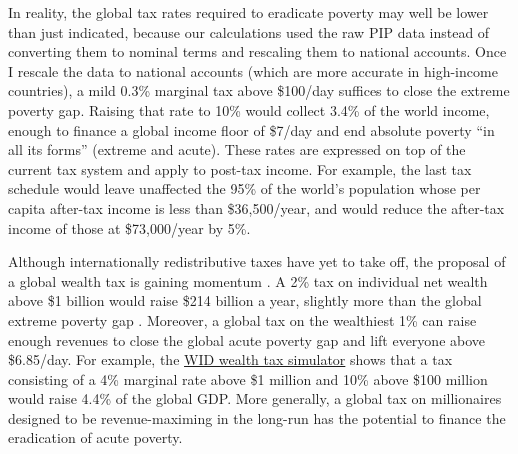 In reality, the global tax rates required to eradicate poverty may well be lower than just indicated, because our calculations used the raw PIP data instead of converting them to nominal terms and rescaling them to national accounts. Once I rescale the data to national accounts (which are more accurate in high-income countries), %
a mild 0.3\% marginal tax above \$100/day suffices to close the extreme poverty gap. Raising that rate to 10\% would collect 3.4\% of the world income, enough to finance a global income floor of \$7/day and end absolute poverty ``in all its forms'' (extreme and acute). %
These rates are expressed on top of the current tax system and apply to post-tax income. For example, the last tax schedule would leave unaffected the 95\% of the world's population whose per capita after-tax income is less than \$36,500/year, and would reduce the after-tax income of those at \$73,000/year by 5\%. 


Although internationally redistributive taxes have yet to take off, the proposal of a global wealth tax is gaining momentum \citep{piketty_brief_2022}. A 2\% tax on individual net wealth above \$1 billion would raise \$214 billion a year, slightly more than the global extreme poverty gap \citep{alstadsaeter_global_2024}. Moreover, a global tax on the wealthiest 1\% can raise enough revenues to close the global acute poverty gap and lift everyone above \$6.85/day. For example, the \href{https://wid.world/world-wealth-tax-simulator}{WID wealth tax simulator} shows that a tax consisting of a 4\% marginal rate above \$1 million and 10\% above \$100 million would raise 4.4\% of the global GDP. More generally, a global tax on millionaires designed to be revenue-maximing in the long-run has the potential to finance the eradication of acute poverty. 

